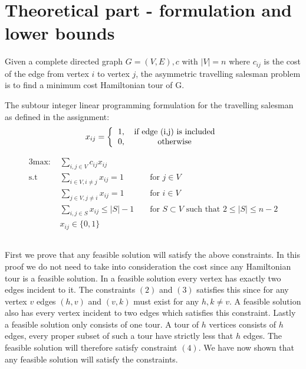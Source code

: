 \section{Theoretical part - formulation and lower bounds}
Given a complete directed graph $G = (V,E),c$ with $|V| = n$ where $c_{ij}$ is the cost of the edge from vertex $i$ to vertex $j$, the asymmetric travelling salesman problem is to find a minimum cost Hamiltonian tour of G.

The subtour integer linear programming formulation for the travelling salesman as defined in the assignment:
\[ 
x_{ij} =
\left \{
  \begin{tabular}{ccc}
  1, & if edge (i,j) is included\\
  0, & otherwise 
  \end{tabular}
\right .
\]

\begin{alignat}{3}
\text{max: }    &\sum_{i,j \in V} c_{ij} x_{ij}\\
\text{s.t }     & \sum_{i \in V, i \neq j} x_{ij} = 1  && \text{ for } j \in V\\
                & \sum_{j \in V, j \neq i} x_{ij} = 1  && \text{ for } i \in V\\
                & \sum_{i,j \in S} x_{ij} \leq |S| - 1 && \text{ for } S \subset V \text{ such that } 2 \leq |S| \leq n - 2 \\
                & x_{ij} \in \{0,1\}
\end{alignat}

\subsection{}
First we prove that any feasible solution will satisfy the above constraints. In this proof we do not need to take into consideration the cost since any Hamiltonian tour is a feasible solution. In a feasible solution every vertex has exactly two edges incident to it. The constraints $(2)$ and $(3)$ satisfies this since for any vertex $v$ edges $(h,v)$ and $(v,k)$ must exist for any $h,k \neq v$. A feasible solution also has every vertex incident to two edges which satisfies this constraint. Lastly a feasible solution only consists of one tour. A tour of $h$ vertices consists of $h$ edges, every proper subset of such a tour have strictly less that $h$ edges. The feasible solution will therefore satisfy constraint $(4)$.  We have now shown that any feasible solution will satisfy the constraints. 


